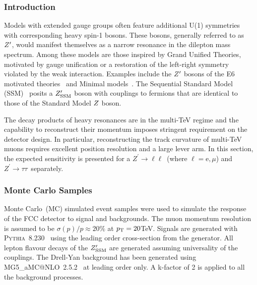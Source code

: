 \documentclass{cernrep}
\newcommand*{\Zptata}{\ensuremath{Z^{\prime}\rightarrow \tau\tau}}
\newcommand*{\Zpll}{\ensuremath{Z^{\prime}\rightarrow \ell\ell}}
\begin{document}
\subsubsection{Introduction}
Models with extended gauge groups often feature additional U(1) symmetries with corresponding heavy spin-1 bosons. These bosons, generally referred to as $Z^{\prime}$, would manifest themselves as a narrow resonance in the dilepton mass spectrum. Among these models are those inspired by Grand Unified Theories, motivated by gauge unification or a restoration of the left-right symmetry violated by the weak interaction. Examples include the $Z^{\prime}$ bosons of the E6 motivated theories~\cite{London:1986jz,Joglekar:2016yap,Langacker:2008yv} and Minimal models~\cite{Salvioni:2009mt}. The Sequential Standard Model (SSM)~\cite{Langacker:2008yv} posits a $Z^{\prime}_{\mathrm{SSM}}$ boson with couplings to fermions that are identical to those of the Standard Model $Z$ boson.

The decay products of heavy resonances are in the multi-TeV regime and the capability to reconstruct their momentum imposes stringent requirement on the detector design. In particular, reconstructing the track curvature of multi-TeV muons requires excellent position resolution and a large lever arm. In this section, the expected sensitivity is presented for a \Zpll\ (where $\ell=\mathrm{e},\mu$) and \Zptata\ separately.

\subsubsection{Monte Carlo Samples}
Monte Carlo~(MC) simulated event samples were used to simulate the response of the FCC detector to signal and backgrounds. The muon momentum resolution is assumed to be $\sigma(p)/p \approx 20\%$ at $p_{\text{T}}= 20 $TeV. Signals are generated with {\scshape Pythia}~8.230~\cite{Sjostrand:2014zea} using the leading order cross-section from the generator.
All lepton flavour decays of the $Z^{\prime}_{\mathrm{SSM}}$ are generated assuming universality of the couplings.
The Drell-Yan background has been generated using {\scshape MG5\_}a{\scshape MC@NLO}~2.5.2~\cite{Alwall:2014} at leading order only. A k-factor of 2 is applied to all the background processes.

\end{document}

